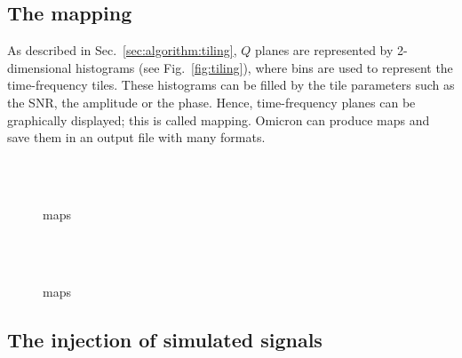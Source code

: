 \subsection{The mapping} \label{sec:algorithm:mapping}

As described in Sec.~\ref{sec:algorithm:tiling}, $Q$ planes are represented by 2-dimensional histograms (see Fig.~\ref{fig:tiling}), where bins are used to represent the time-frequency tiles. These histograms can be filled by the tile parameters such as the SNR, the amplitude or the phase. Hence, time-frequency planes can be graphically displayed; this is called mapping. Omicron can produce maps and save them in an output file with many formats.

\begin{figure}
  \center
    \\
    \\
   
  \caption{maps}
  \label{fig:gw150914_mapsnr}
\end{figure}

\begin{figure}
  \center
    \\
    \\
   
  \caption{maps}
  \label{fig:gw150914_mapsamp}
\end{figure}

\subsection{The injection of simulated signals} \label{sec:algorithm:injections}
